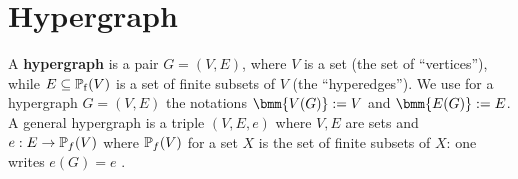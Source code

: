 \documentclass[12pt]{book}
\begin{document}
\section{Hypergraph}
\label{sec:hpg}

\begin{defi}\label{def:hypergraphs}
  A \textbf{hypergraph} is a pair $G=(V,E)$, where $V$ is a set (the set of ``vertices''), while $E \subseteq \operatorname{\mathbb{P}_f}(V)$ is a set of finite subsets of $V$ (the ``hyperedges''). 
  We use for a hypergraph $G = (V,E)$ the notations $\bmm{V(G)} := V$ and $\bmm{E(G)} := E$. A general hypergraph is a triple $(V,E,e)$ where $V, E$ are sets and $e:E \rightarrow \operatorname{\mathbb{P}}_f(V)$ 
  where $\operatorname{\mathbb{P}}_f(V)$ for a set $X$ is the set of finite subsets of $X$: one writes $e(G)=e$ \cite{h5}. 
\end{defi}
\end{document}
